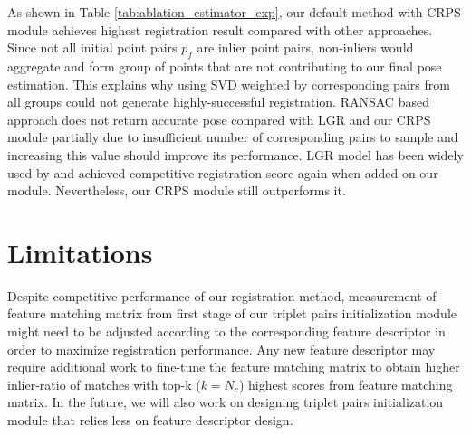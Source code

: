 \documentclass[conference,compsoc]{IEEEtran}
\begin{document}
As shown in Table \ref{tab:ablation_estimator_exp}, our default method with CRPS module achieves highest registration result compared with other approaches. Since not all initial point pairs ${p_f}$ are inlier point pairs, non-inliers would aggregate and form group of points that are not contributing to our final pose estimation. This explains why using SVD weighted by corresponding pairs from all groups could not generate highly-successful registration. RANSAC based approach does not return accurate pose compared with LGR and our CRPS module partially due to insufficient number of corresponding pairs to sample and increasing this value should improve its performance. LGR model has been widely used by \cite{yu2021cofinet, bai2021pointdsc, qin2022geometric, chen2022sc2} and achieved competitive registration score again when added on our module. Nevertheless, our CRPS module still outperforms it.

\section{Limitations}
Despite competitive performance of our registration method, measurement of feature matching matrix from first stage of our triplet pairs initialization module might need to be adjusted according to the corresponding feature descriptor in order to maximize registration performance. Any new feature descriptor may require additional work to fine-tune the feature matching matrix to obtain higher inlier-ratio of matches with top-k (${k=N_c}$) highest scores from feature matching matrix. In the future, we will also work on designing triplet pairs initialization module that relies less on feature descriptor design.






\end{document}

